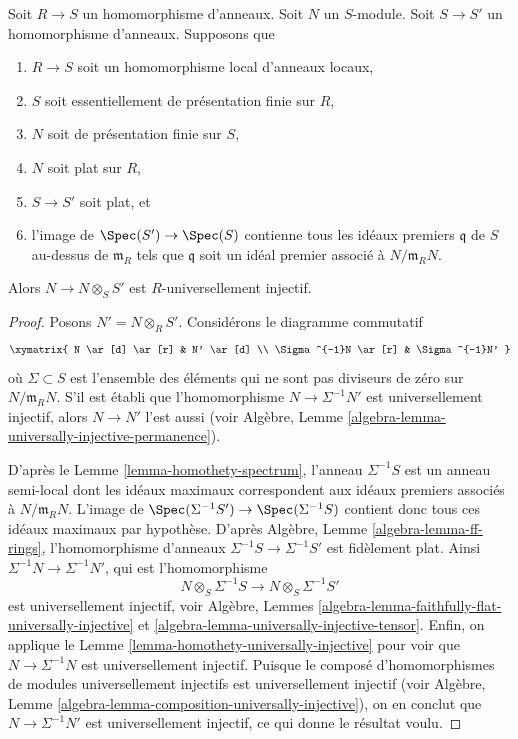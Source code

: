 \begin{lemma}
\label{lemma-base-change-universally-flat-local}
Soit $R \to S$ un homomorphisme d'anneaux.
Soit $N$ un $S$-module.
Soit $S \to S'$ un homomorphisme d'anneaux.
Supposons que
\begin{enumerate}
\item $R \to S$ soit un homomorphisme local d'anneaux locaux,
\item $S$ soit essentiellement de présentation finie sur $R$,
\item $N$ soit de présentation finie sur $S$,
\item $N$ soit plat sur $R$,
\item $S \to S'$ soit plat, et
\item l'image de $\Spec(S') \to \Spec(S)$ contienne
tous les idéaux premiers $\mathfrak q$ de $S$ au-dessus de $\mathfrak m_R$
tels que $\mathfrak q$ soit un idéal premier associé à $N/\mathfrak m_R N$.
\end{enumerate}
Alors $N \to N \otimes_S S'$ est $R$-universellement injectif.
\end{lemma}

\begin{proof}
Posons $N' = N \otimes_R S'$. Considérons le diagramme commutatif
$$
\xymatrix{
N \ar[d] \ar[r] & N' \ar[d] \\
\Sigma^{-1}N \ar[r] & \Sigma^{-1}N'
}
$$
où $\Sigma \subset S$ est l'ensemble des éléments qui ne sont pas
diviseurs de zéro sur $N/\mathfrak m_R N$. S'il est établi que l'homomorphisme
$N \to \Sigma^{-1}N'$ est universellement injectif, alors $N \to N'$
l'est aussi (voir
Algèbre, Lemme \ref{algebra-lemma-universally-injective-permanence}).

\medskip\noindent
D'après le
Lemme \ref{lemma-homothety-spectrum},
l'anneau $\Sigma^{-1}S$ est un anneau semi-local dont les idéaux maximaux
correspondent aux idéaux premiers associés à $N/\mathfrak m_R N$.
L'image de
$\Spec(\Sigma^{-1}S') \to \Spec(\Sigma^{-1}S)$
contient donc tous ces idéaux maximaux par hypothèse. D'après
Algèbre, Lemme \ref{algebra-lemma-ff-rings},
l'homomorphisme d'anneaux $\Sigma^{-1}S \to \Sigma^{-1}S'$ est fidèlement plat.
Ainsi $\Sigma^{-1}N \to \Sigma^{-1}N'$, qui est l'homomorphisme
$$
N \otimes_S \Sigma^{-1}S \longrightarrow N \otimes_S \Sigma^{-1}S'
$$
est universellement injectif, voir
Algèbre, Lemmes \ref{algebra-lemma-faithfully-flat-universally-injective} et
\ref{algebra-lemma-universally-injective-tensor}.
Enfin, on applique
le Lemme \ref{lemma-homothety-universally-injective}
pour voir que $N \to \Sigma^{-1}N$ est universellement injectif.
Puisque le composé d'homomorphismes de modules universellement injectifs est universellement
injectif (voir
Algèbre, Lemme \ref{algebra-lemma-composition-universally-injective}),
on en conclut que $N \to \Sigma^{-1}N'$ est universellement injectif, ce qui donne le résultat voulu.
\end{proof}

